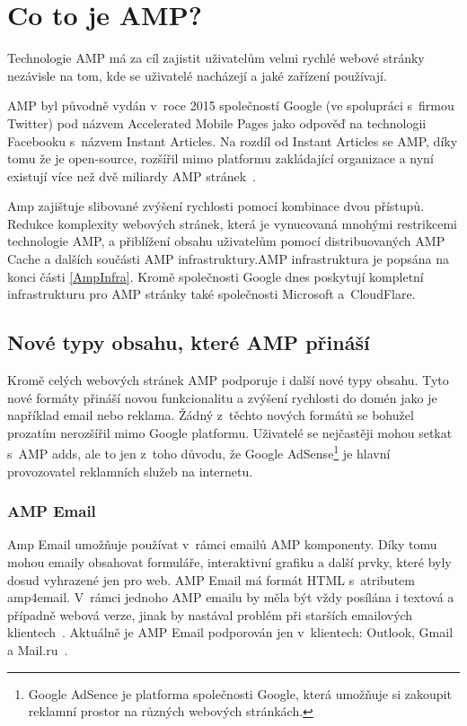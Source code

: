 \chapter{Co to je AMP?}
\label{AMP}
Technologie AMP má za cíl zajistit uživatelům velmi rychlé webové stránky nezávisle na tom, kde se
uživatelé nacházejí a jaké zařízení používají.

AMP byl původně vydán v~roce 2015 společností Google (ve spolupráci s~firmou Twitter) pod názvem Accelerated Mobile Pages jako odpověď
na technologii Facebooku s~názvem Instant Articles. Na rozdíl od Instant Articles se AMP, díky tomu že je
open-source, rozšířil mimo platformu zakládající organizace a nyní existují více než dvě miliardy AMP
stránek~\cite{AMPTurbo}.

Amp zajištuje slibované zvýšení rychlosti pomocí kombinace dvou přístupů. Redukce komplexity webových stránek, která je vynucovaná mnohými restrikcemi technologie AMP, a přiblížení obsahu uživatelům pomocí distribuovaných AMP Cache a dalších součásti AMP infrastruktury.AMP infrastruktura je popsána na konci části \ref{AmpInfra}. Kromě společnosti Google dnes poskytují kompletní infrastrukturu pro AMP stránky také
společnosti Microsoft a~CloudFlare.

\section{Nové typy obsahu, které AMP přináší}
Kromě celých webových stránek AMP podporuje i další nové typy obsahu. Tyto nové formáty přináší novou funkcionalitu a zvýšení rychlosti do domén jako je například email nebo reklama. Žádný z~těchto nových formátů se bohužel prozatím nerozšířil mimo Google platformu. Uživatelé se nejčastěji mohou setkat s~AMP adds, ale to jen z~toho důvodu, že Google AdSense\footnote{Google AdSence je platforma společnosti Google, která umožňuje si zakoupit reklamní prostor na různých webových stránkách.} je hlavní provozovatel reklamních služeb na internetu.
\subsection*{AMP Email}
Amp Email umožňuje používat v~rámci emailů AMP komponenty. Díky tomu mohou emaily obsahovat formuláře, interaktivní grafiku a další prvky, které byly dosud vyhrazené jen pro web. AMP Email má formát HTML s~atributem amp4email. V~rámci jednoho AMP emailu by měla být vždy posílána i textová a případně webová verze, jinak by nastával problém při starších emailových klientech~\cite[Ch.\ 6, p.\ 285]{VzhuruDoAMP}.
Aktuálně je AMP Email podporován jen v~klientech:
Outlook, Gmail a Mail.ru~\cite{EmailSupport}.
